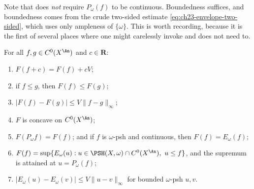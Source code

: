 Note that  does \emph{not} require
\(P_\omega(f)\) to be continuous.  Boundedness suffices, and boundedness
comes from the crude two-sided estimate \eqref{eq:ch23-envelope-two-sided},
which uses only ampleness of \(\{\omega\}\).  This is worth recording,
because it is the first of several places where one might carelessly invoke
 and does not need to.

\begin{proposition}
\label{prop:ch27-F-elementary}
For all \(f,g\in C^0(X^{\An})\) and \(c\in\mathbf R\):
\begin{enumerate}
\item \(F(f+c)=F(f)+cV\);
\item if \(f\leq g\), then \(F(f)\leq F(g)\);
\item \(|F(f)-F(g)|\leq V\lVert f-g\rVert_\infty\);
\item \(F\) is concave on \(C^0(X^{\An})\);
\item \(F(P_\omega f)=F(f)\); and if \(f\) is \(\omega\)-psh and continuous,
      then \(F(f)=E_\omega(f)\);
\item \(F(f)=\sup\{E_\omega(u): u\in\PSH(X,\omega)\cap C^0(X^{\An}),\
      u\leq f\}\), and the supremum is attained at \(u=P_\omega(f)\);
\item \(|E_\omega(u)-E_\omega(v)|\leq V\lVert u-v\rVert_\infty\) for
      bounded \(\omega\)-psh \(u,v\).
\end{enumerate}
\end{proposition}

